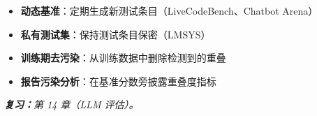 \begin{questionbox}
\begin{itemize}
  \item \textbf{动态基准}：定期生成新测试条目（LiveCodeBench、Chatbot Arena）
  \item \textbf{私有测试集}：保持测试条目保密（LMSYS）
  \item \textbf{训练期去污染}：从训练数据中删除检测到的重叠
  \item \textbf{报告污染分析}：在基准分数旁披露重叠度指标
\end{itemize}

\emph{\textbf{复习：}第 14 章（LLM 评估）。}
\end{questionbox}

